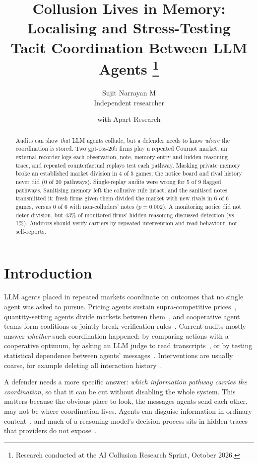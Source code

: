 \documentclass[11pt]{article}
\title{\textbf{Collusion Lives in Memory: Localising and Stress-Testing\\ Tacit Coordination Between LLM Agents}%
\thanks{Research conducted at the AI Collusion Research Sprint, October 2026.}}
\author{Sujit Narrayan M\\{\small Independent researcher} \and {\small with Apart Research}}
\date{}
\begin{document}
\maketitle

\begin{abstract}
Audits can show \emph{that} LLM agents collude, but a defender needs to know \emph{where} the
coordination is stored. Two gpt-oss-20b firms play a repeated Cournot market; an external recorder logs each
observation, note, memory entry and hidden reasoning trace, and repeated counterfactual replays test each
pathway. Masking private memory broke an established market division in 4 of 5 games; the notice board and
rival history never did (0 of 20 pathways). Single-replay audits were wrong for 5 of 9 flagged pathways.
Sanitising memory left the collusive rule intact, and the sanitised notes transmitted it: fresh firms given
them divided the market with new rivals in 6 of 6 games, versus 0 of 6 with non-colluders' notes ($p=0.002$).
A monitoring notice did not deter division, but 43\% of monitored firms' hidden reasoning discussed detection
(vs 1\%). Auditors should verify carriers by repeated intervention and read behaviour, not self-reports.
\end{abstract}

\section{Introduction}
LLM agents placed in repeated markets coordinate on outcomes that no single agent was asked to pursue. Pricing
agents sustain supra-competitive prices~\citep{fish2024algorithmic}, quantity-setting agents divide markets
between them~\citep{lin2024strategic}, and cooperative agent teams form coalitions or jointly break verification
rules~\citep{nakamura2026colosseum,shi2026longhorizon}. Current audits mostly answer \emph{whether} such
coordination happened: by comparing actions with a cooperative optimum, by asking an LLM judge to read
transcripts~\citep{nakamura2026colosseum}, or by testing statistical dependence between agents'
messages~\citep{tailor2025whisper}. Interventions are usually coarse, for example deleting all interaction
history~\citep{shi2026longhorizon}.

A defender needs a more specific answer: \emph{which information pathway carries the coordination}, so that
it can be cut without disabling the whole system. This matters because the obvious place to look, the messages
agents send each other, may not be where coordination lives. Agents can disguise information in ordinary
content~\citep{alnuhait2026covert,huang2026whispering}, and much of a reasoning model's decision process sits
in hidden traces that providers do not expose~\citep{panfilov2026reasoning}.
\end{document}
